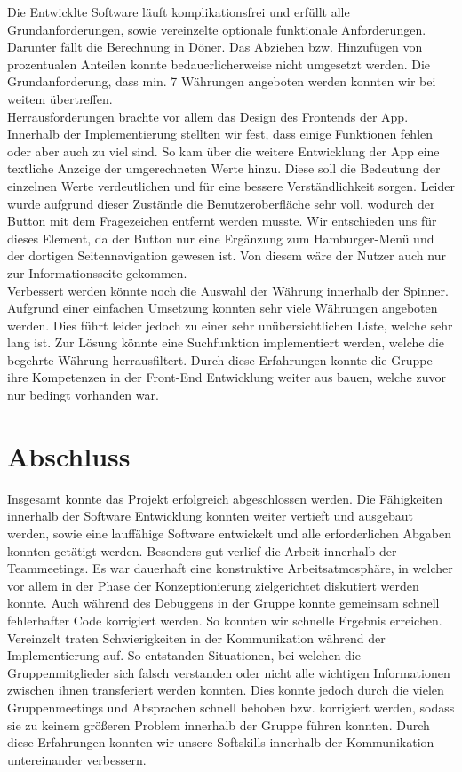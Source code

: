 \documentclass[conference]{IEEEtran}
\begin{document}
Die Entwicklte Software läuft komplikationsfrei und erfüllt alle Grundanforderungen, sowie vereinzelte optionale funktionale Anforderungen. Darunter fällt die Berechnung in Döner.  Das Abziehen bzw. Hinzufügen von prozentualen Anteilen konnte bedauerlicherweise nicht umgesetzt werden. Die Grundanforderung, dass min. 7 Währungen angeboten werden konnten wir bei weitem übertreffen.\\
Herrausforderungen brachte vor allem das Design des Frontends der App. Innerhalb der Implementierung stellten wir fest, dass einige Funktionen fehlen oder aber auch zu viel sind. So kam über die weitere Entwicklung der App eine textliche Anzeige der umgerechneten Werte hinzu. Diese soll die Bedeutung der einzelnen Werte verdeutlichen und für eine bessere Verständlichkeit sorgen. Leider wurde aufgrund dieser Zustände die Benutzeroberfläche sehr voll, wodurch der Button mit dem Fragezeichen entfernt werden musste. Wir entschieden uns für dieses Element, da der Button nur eine Ergänzung zum Hamburger-Menü und der dortigen Seitennavigation gewesen ist. Von diesem wäre der Nutzer auch nur zur Informationsseite gekommen. \\
Verbessert werden könnte noch die Auswahl der Währung innerhalb der Spinner. Aufgrund einer einfachen Umsetzung konnten sehr viele Währungen angeboten werden. Dies führt leider jedoch zu einer sehr unübersichtlichen Liste, welche sehr lang ist. Zur Lösung könnte eine Suchfunktion implementiert werden, welche die begehrte Währung herrausfiltert. Durch diese Erfahrungen konnte die Gruppe ihre Kompetenzen in der Front-End Entwicklung weiter aus bauen, welche zuvor nur bedingt vorhanden war.

\section{Abschluss}
Insgesamt konnte das Projekt erfolgreich abgeschlossen werden. Die Fähigkeiten innerhalb der Software Entwicklung konnten weiter vertieft und ausgebaut werden, sowie eine lauffähige Software entwickelt und alle erforderlichen Abgaben konnten getätigt werden.
Besonders gut verlief die Arbeit innerhalb der Teammeetings. Es war dauerhaft eine konstruktive Arbeitsatmosphäre, in welcher vor allem in der Phase der Konzeptionierung zielgerichtet diskutiert werden konnte. Auch während des Debuggens in der Gruppe konnte gemeinsam schnell fehlerhafter Code korrigiert werden. So konnten wir schnelle Ergebnis erreichen. \\
Vereinzelt traten Schwierigkeiten in der Kommunikation während der Implementierung auf. So entstanden Situationen, bei welchen die Gruppenmitglieder sich falsch verstanden oder nicht alle wichtigen Informationen zwischen ihnen transferiert werden konnten. Dies konnte jedoch durch die vielen Gruppenmeetings und Absprachen schnell behoben bzw. korrigiert werden, sodass sie zu keinem größeren Problem innerhalb der Gruppe führen konnten. Durch diese Erfahrungen konnten wir unsere Softskills innerhalb der Kommunikation untereinander verbessern.
\end{document}
